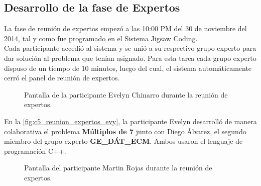 \subsection{Desarrollo de la fase de Expertos}
La fase de reunión de expertos empezó a las 10:00 PM del 30 de noviembre del 2014, tal y como fue programado en el Sistema Jigsaw Coding.\\

Cada participante accedió al sistema y se unió a su respectivo grupo experto para dar solución al problema que tenían asignado. Para esta tarea cada grupo experto dispuso de un tiempo de 10 minutos, luego del cual, el sistema automáticamente cerró el panel de reunión de expertos.\\

\begin{figure}
	\centering
	\caption[Reunión de Expertos - Evelyn Chinarro]{Pantalla de la participante Evelyn Chinarro durante la reunión de expertos.}
	\label{fig:c5_reunion_expertos_evy}
\end{figure}

En la \autoref{fig:c5_reunion_expertos_evy}, la participante Evelyn desarrolló de manera colaborativa el problema \textbf{Múltiplos de 7} junto con Diego Álvarez, el segundo miembro del grupo experto \textbf{GE\_DÁT\_ECM}. Ambos usaron el lenguaje de programación C++.\\

\begin{figure}
	\centering
	\caption[Reunión de Expertos - Martin Rojas]{Pantalla del participante Martin Rojas durante la reunión de expertos.}
	\label{fig:c5_reunion_expertos_martin}
\end{figure}

